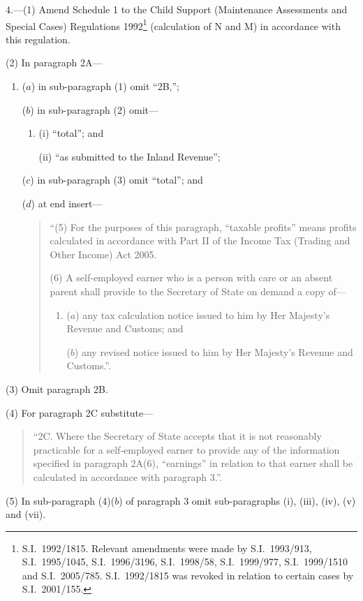 \documentclass[12pt,a4paper]{article}
\begin{document}
4.---(1)  Amend Schedule 1 to the Child Support (Maintenance Assessments and Special Cases) Regulations 1992\footnote{S.I.\ 1992/1815. Relevant amendments were made by S.I.\ 1993/913, S.I.\ 1995/1045, S.I.\ 1996/3196, S.I.\ 1998/58, S.I.\ 1999/977, S.I.\ 1999/1510 and S.I.\ 2005/785. S.I.\ 1992/1815 was revoked in relation to certain cases by S.I.\ 2001/155.} (calculation of N and M) in accordance with this regulation.

(2) In paragraph 2A—
\begin{enumerate}\item[]
($a$) in sub-paragraph (1) omit “2B,”;

($b$) in sub-paragraph (2) omit—
\begin{enumerate}\item[]
(i) “total”; and

(ii) “as submitted to the Inland Revenue”;
\end{enumerate}

($c$) in sub-paragraph (3) omit “total”; and

($d$) at end insert—
\begin{quotation}
“(5) For the purposes of this paragraph, “taxable profits” means profits calculated in accordance with Part II of the Income Tax (Trading and Other Income) Act 2005.

(6) A self-employed earner who is a person with care or an absent parent shall provide to the Secretary of State on demand a copy of—
\begin{enumerate}\item[]
($a$) any tax calculation notice issued to him by Her Majesty’s Revenue and Customs; and

($b$) any revised notice issued to him by Her Majesty’s Revenue and Customs.”.
\end{enumerate}
\end{quotation}
\end{enumerate}

(3) Omit paragraph 2B.

(4) For paragraph 2C substitute—
\begin{quotation}
“2C.  Where the Secretary of State accepts that it is not reasonably practicable for a self-employed earner to provide any of the information specified in paragraph 2A(6), “earnings” in relation to that earner shall be calculated in accordance with paragraph 3.”.
\end{quotation}

(5) In sub-paragraph (4)($b$)  of paragraph 3 omit sub-paragraphs (i), (iii), (iv), (v) and (vii).
\end{document}
